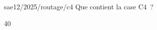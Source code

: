 \begin{question}{sae12/2025/routage/c4}
  Que contient la case C4~?
  \begin{reponses}{4}{0}
  \end{reponses}
\end{question}
